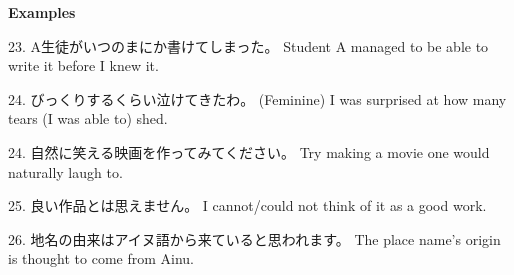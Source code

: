\par{\textbf{Examples } }

\par{23. A生徒がいつのまにか書けてしまった。 \hfill\break
Student A managed to be able to write it before I knew it. }

\par{24. びっくりするくらい泣けてきたわ。 (Feminine) \hfill\break
I was surprised at how many tears (I was able to) shed. }

\par{24. 自然に笑える映画を作ってみてください。 \hfill\break
Try making a movie one would naturally laugh to. }

\par{25. 良い作品とは思えません。 \hfill\break
I cannot\slash could not think of it as a good work. }

\par{26. 地名の由来はアイヌ語から来ていると思われます。 \hfill\break
The place name's origin is thought to come from Ainu. }
    